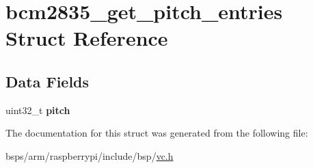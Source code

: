 \hypertarget{structbcm2835__get__pitch__entries}{}\section{bcm2835\+\_\+get\+\_\+pitch\+\_\+entries Struct Reference}
\label{structbcm2835__get__pitch__entries}
\subsection*{Data Fields}
\begin{DoxyCompactItemize}
\item 
\mbox{\label{structbcm2835__get__pitch__entries_ab19576f07673d287726a5fb55338f1f4}} 
uint32\+\_\+t {\bfseries pitch}
\end{DoxyCompactItemize}


The documentation for this struct was generated from the following file\+:\begin{DoxyCompactItemize}
\item 
bsps/arm/raspberrypi/include/bsp/\mbox{\hyperlink{vc_8h}{vc.\+h}}\end{DoxyCompactItemize}
